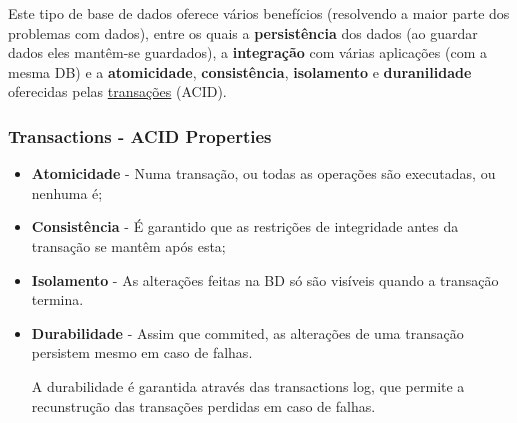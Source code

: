 \documentclass{article}
\begin{document}
Este tipo de base de dados oferece vários benefícios (resolvendo a maior parte dos problemas com dados), entre os quais a \textbf{persistência} dos dados (ao guardar dados eles mantêm-se guardados),
a \textbf{integração} com várias aplicações (com a mesma DB) e a \textbf{atomicidade}, \textbf{consistência}, \textbf{isolamento} e \textbf{duranilidade}
oferecidas pelas \uline{transações} (ACID).

\subsubsection{Transactions - ACID Properties}

\begin{itemize}
  \item \textbf{Atomicidade} - Numa transação, ou todas as operações são executadas, ou nenhuma é;
  \item \textbf{Consistência} - É garantido que as restrições de integridade
  antes da transação se mantêm após esta;
  \item \textbf{Isolamento} - As alterações feitas na BD só são visíveis quando a transação termina.
  \item \textbf{Durabilidade} - Assim que commited, as alterações de uma transação persistem mesmo em caso de falhas.
  
  A durabilidade é garantida através das
transactions log, que permite a recunstrução das transações perdidas em caso
de falhas.
\end{itemize}

\pagebreak
\end{document}
